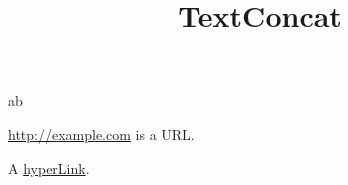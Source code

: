 \documentclass[a4paper,11pt,oneside,openany,report]{jsbook}
\title{TextConcat}
\begin{document}
\maketitle
ab

\url{http://example.com} is a URL.

A \href{http://example.com}{hyperLink}.
\end{document}

